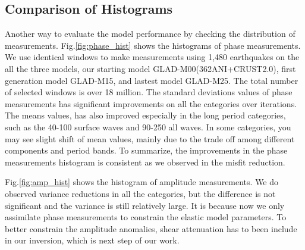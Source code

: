 \documentclass[extra,mreferee]{gji}
\begin{document}
\subsection{Comparison of Histograms}

Another way to evaluate the model performance by checking the distribution
of measurements. Fig.\ref{fig:phase_hist} shows the histograms of phase
measurements. We use identical windows to make measurements using 1,480
earthquakes on the all the three models, our starting model
GLAD-M00(362ANI+CRUST2.0), first generation model GLAD-M15,
and lastest model GLAD-M25. The total number of selected windows is over
18 million. The standard deviations values of phase measurements has
significant improvements on all the categories over iterations.
The means values, has also improved especially in the long period categories,
such as the 40-100 surface waves and 90-250 all waves. In some categories,
you may see slight shift of mean values, mainly due to the trade off among
different components and period bands. To summarize, the improvements in
the phase measurements histogram is consistent as we observed in the
misfit reduction.

Fig.\ref{fig:amp_hist} shows the histogram of amplitude measurements. We do
observed variance reductions in all the categories, but the difference is
not significant and the variance is still relatively large.
It is because now we only assimilate phase measurements to
constrain the elastic model parameters. To better constrain the amplitude
anomalies, shear attenuation has to been include in our inversion, which is
next step of our work.
\end{document}
